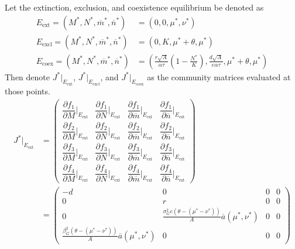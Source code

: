 \documentclass{amsart}
\theoremstyle{definition}
\theoremstyle{remark}
\numberwithin{equation}{section}
\begin{document}
Let the extinction, exclusion, and coexistence equilibrium be denoted as
\begin{align*}
	E_{\text{ext}} = (M^*, N^*, \overline{m}^*, \overline{n}^*) &= (0, 0, \mu^*, \nu^*) \\
	E_{\text{excl}} = (M^*, N^*, \overline{m}^*, \overline{n}^*) &= (0, K, \mu^* + \theta, \mu^*) \\
	E_{\text{coex}} = (M^*, N^*, \overline{m}^*, \overline{n}^*) &= \left(\frac{r\sqrt{A}}{\alpha\tau}\left(1 - \frac{N^*}{K}\right), \frac{d\sqrt{A}}{e\alpha\tau}, \mu^* + \theta, \mu^*\right)
\end{align*}
Then denote $J^*|_{E_{\text{ext}}}$, $J^*|_{E_{\text{excl}}}$, and $J^*|_{E_{\text{coex}}}$ as the community matrices evaluated at those points.
\begin{align*}
	J^*|_{E_{\text{ext}}} &= \left(\begin{array}{cccc}
		\dfrac{\partial f_1}{\partial M}\Big|_{E_{\text{ext}}} & \dfrac{\partial f_1}{\partial N}\Big|_{E_{\text{ext}}} & \dfrac{\partial f_1}{\partial \overline{m}}\Big|_{E_{\text{ext}}} & \dfrac{\partial f_1}{\partial \overline{n}}\Big|_{E_{\text{ext}}} \\[10px]
		\dfrac{\partial f_2}{\partial M}\Big|_{E_{\text{ext}}} & \dfrac{\partial f_2}{\partial N}\Big|_{E_{\text{ext}}} & \dfrac{\partial f_2}{\partial \overline{m}}\Big|_{E_{\text{ext}}} & \dfrac{\partial f_2}{\partial \overline{n}}\Big|_{E_{\text{ext}}} \\[10px]
		\dfrac{\partial f_3}{\partial M}\Big|_{E_{\text{ext}}} & \dfrac{\partial f_3}{\partial N}\Big|_{E_{\text{ext}}} & \dfrac{\partial f_3}{\partial \overline{m}}\Big|_{E_{\text{ext}}} & \dfrac{\partial f_3}{\partial \overline{n}}\Big|_{E_{\text{ext}}} \\[10px]
		\dfrac{\partial f_4}{\partial M}\Big|_{E_{\text{ext}}} & \dfrac{\partial f_4}{\partial N}\Big|_{E_{\text{ext}}} & \dfrac{\partial f_4}{\partial \overline{m}}\Big|_{E_{\text{ext}}} & \dfrac{\partial f_4}{\partial \overline{n}}\Big|_{E_{\text{ext}}}
	\end{array}\right) \\
	&= \left(\begin{array}{cccc}
		-d & 0 & 0 & 0 \\
		0 & r & 0 & 0 \\
		0 & \frac{\sigma_{G}^2e(\theta - (\mu^* - \nu^*))}{A}\overline{a}(\mu^*, \nu^*) & 0 & 0 \\
		\frac{\beta_{G}^2(\theta - (\mu^* - \nu^*))}{A}\overline{a}(\mu^*, \nu^*) & 0 & 0 & 0
	\end{array}\right)
\end{align*}
\end{document}
